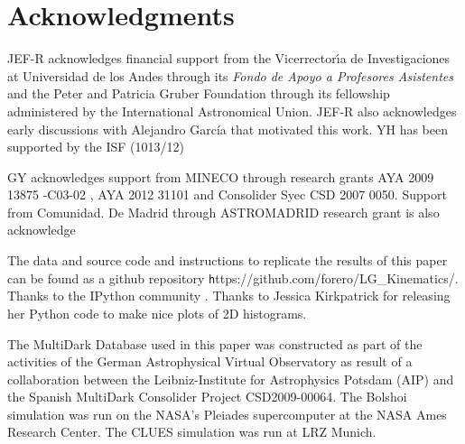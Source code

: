 \documentclass{emulateapj}
\begin{document}
\label{sec:conclusions}
\section*{Acknowledgments}  
JEF-R acknowledges financial support from the Vicerrector\'{\i}a de
Investigaciones at Universidad de los Andes through its {\it Fondo de
  Apoyo a Profesores Asistentes} and the Peter and Patricia Gruber
Foundation through its fellowship administered by the International
Astronomical Union. JEF-R also acknowledges early discussions with
Alejandro Garc\'ia that motivated this work. YH has been supported by
the ISF (1013/12) 

GY  acknowledges support from MINECO through research grants AYA 2009
13875 -C03-02 , AYA 2012 31101  and Consolider Syec CSD 2007 0050.
Support from Comunidad. De Madrid  through ASTROMADRID research grant
is also acknowledge  

The data and source code and instructions to replicate the results of
this paper can be found as a github repository {\texttt
  https://github.com/forero/LG\_Kinematics/}. Thanks to the IPython
community \citep{IPython}. Thanks to Jessica Kirkpatrick for releasing
her Python code to make nice plots of 2D histograms.  

The MultiDark Database used in this paper  was constructed as part of
the activities of the German Astrophysical Virtual Observatory as
result of a collaboration between the Leibniz-Institute for
Astrophysics Potsdam (AIP) and the Spanish MultiDark Consolider
Project CSD2009-00064. The Bolshoi simulation was run on the NASA's
Pleiades supercomputer at the NASA Ames Research Center. The CLUES simulation
was run at LRZ Munich.
\end{document}
